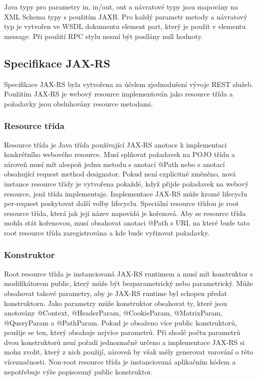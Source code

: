 \documentclass[11pt,twoside,a4paper]{book}
\begin{document}
Java typy pro parametry in, in/out, out a návratové typy jsou mapovány na XML Schema typy
s použitím JAXB. Pro každý parametr metody a návratový typ je vytvořen ve WSDL
dokumentu element part, který je použit v elementu message. Při použití RPC stylu nesmí být
posílány null hodnoty.

\subsection{Specifikace JAX-RS}

Specifikace JAX-RS byla vytvořena za účelem zjednodušení vývoje REST služeb. Použitím
JAX-RS je webový resource implementován jako resource třída a požadavky jsou
obsluhovány resource metodami.

\subsubsection{Resource třída}

Resource třída je Java třída používající JAX-RS anotace k implementaci konkrétního
webového resource. Musí splňovat požadavek na POJO třídu a zároveň musí mít alespoň
jednu metodu s anotací @Path nebo s anotací obsahující request method designator. Pokud
není explicitně změněno, nová instance resource třídy je vytvořena pokaždé, když přijde
požadavek na webový resource, jenž třída implementuje. Implementace JAX-RS může kromě
lifecyclu per-request poskytovat další volby lifecyclu. Speciální resource třídou je root
resource třída, která jak její název napovídá je kořenová. Aby se resource třída mohla stát
kořenovou, musí obsahovat anotaci @Path s URI, na které bude tato root resource třída
zaregistrována a kde bude vyřizovat požadavky.

\subsubsection{Konstruktor}

Root resource třída je instanciovaná JAX-RS runtimem a musí mít konstruktor s
modifikátorem public, který může být bezparametrický nebo parametrický. Může obsahovat
takové parametry, aby je JAX-RS runtime byl schopen předat konstruktoru. Jako parametry
může konstruktor obsahovat ty, které jsou anotovány @Context, @HeaderParam,
@CookieParam, @MatrixParam, @QueryParam a @PathParam. Pokud je obsaženo více
public konstruktorů, použije se ten, který obsahuje nejvíce parametrů. Při shodě počtu
parametrů dvou konstruktorů není pořadí jednoznačně určeno a implementace JAX-RS si
mohu zvolit, který z nich použijí, zároveň by však měly generovat varování o této
víceznačnosti. Non-root resource třída je instanciovaná aplikačním kódem a nepotřebuje výše
popisovaný public konstruktor.
\end{document}
